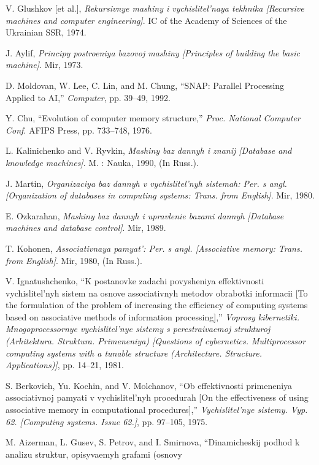 \documentclass{article}
\begin{document}
{\begin{multicols}{2}
{\begin{enumerate}[label={[\arabic*]}]
    \item V. Glushkov [et al.], \textit{Rekursivnye mashiny i vychislitel’naya
tekhnika [Recursive machines and computer engineering]}. IC of
the Academy of Sciences of the Ukrainian SSR, 1974.
    \item J. Aylif, \textit{Principy postroeniya bazovoj mashiny [Principles of
building the basic machine]}. Mir, 1973.
    \item  D. Moldovan, W. Lee, C. Lin, and M. Chung, “SNAP: Parallel
Processing Applied to AI,” \textit{Computer}, pp. 39–49, 1992.
    \item Y. Chu, “Evolution of computer memory structure,” \textit{Proc. National
Computer Conf}. AFIPS Press, pp. 733–748, 1976.
    \item L. Kalinichenko and V. Ryvkin, \textit{Mashiny baz dannyh i znanij
[Database and knowledge machines]}. M. : Nauka, 1990, (In
Russ.).
    \item J. Martin, \textit{Organizaciya baz dannyh v vychislitel’nyh sistemah:
Per. s angl. [Organization of databases in computing systems:
Trans. from English]}. Mir, 1980.
    \item E. Ozkarahan, \textit{Mashiny baz dannyh i upravlenie bazami dannyh
[Database machines and database control]}. Mir, 1989.
    \item T. Kohonen, \textit{Associativnaya pamyat’: Per. s angl. [Associative
memory: Trans. from English]}. Mir, 1980, (In Russ.).
    \item V. Ignatushchenko, “K postanovke zadachi povysheniya effektivnosti vychislitel’nyh sistem na osnove associativnyh metodov
obrabotki informacii [To the formulation of the problem of
increasing the efficiency of computing systems based on associative methods of information processing],” \textit{Voprosy kibernetiki.
Mnogoprocessornye vychislitel’nye sistemy s perestraivaemoj
strukturoj (Arhitektura. Struktura. Primeneniya) [Questions of
cybernetics. Multiprocessor computing systems with a tunable
structure (Architecture. Structure. Applications)]}, pp. 14–21, 1981.
    \item S. Berkovich, Yu. Kochin, and V. Molchanov, “Ob effektivnosti
primeneniya associativnoj pamyati v vychislitel’nyh procedurah
[On the effectiveness of using associative memory in computational
procedures],” \textit{Vychislitel’nye sistemy. Vyp. 62. [Computing systems.
Issue 62.]}, pp. 97–105, 1975.
    \item M. Aizerman, L. Gusev, S. Petrov, and I. Smirnova, “Dinamicheskij podhod k analizu struktur, opisyvaemyh grafami (osnovy

\end{enumerate}}
\end{multicols}}
\end{document}
